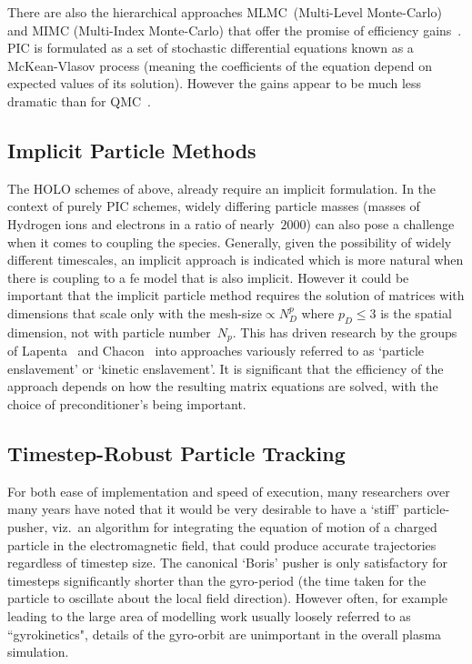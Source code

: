 There are also the hierarchical approaches MLMC~(Multi-Level Monte-Carlo) and MIMC (Multi-Index Monte-Carlo)
that offer the promise of efficiency gains~\cite{Ha18Mult}. PIC is formulated as a set of stochastic
differential equations known as a McKean-Vlasov process (meaning the coefficients of
the equation depend on expected values of its solution). However the gains appear to be much less
dramatic than for QMC~\cite{Ri15mult}.

\subsection{Implicit Particle Methods} \label{sec:implicit}
The HOLO schemes of  above, already require an implicit formulation.
In the context of purely PIC schemes, widely differing particle masses (masses of Hydrogen ions and electrons in a ratio
of nearly~$2000$) can also pose a challenge when it comes to coupling the species. 
Generally, given the possibility of widely
different timescales, an implicit approach is indicated which is more natural 
when there is coupling to a fe model that is also implicit.
However it could be important that the implicit particle method requires the solution of
matrices with dimensions that scale only with the mesh-size$\propto N^p_D$ where $p_D\leq 3$ is 
the spatial dimension, not with particle number~$N_p$. This has driven research by
the groups of Lapenta~\cite{Si18Comp} and Chacon~\cite{Ch11ener} into
approaches variously referred to as `particle enslavement' or `kinetic enslavement'.
It is significant that the efficiency of the approach depends on how the resulting matrix
equations are solved, with the choice of preconditioner's being important. 

\subsection{Timestep-Robust Particle Tracking} \label{sec:robupart}
For both ease of implementation and speed of execution, many researchers 
over many years have noted that it would be very desirable
to have a `stiff' particle-pusher, viz.\ an algorithm for integrating the equation of motion
of a charged particle in the electromagnetic field, that could produce accurate
trajectories regardless of timestep size. The canonical `Boris' pusher is only satisfactory
for timesteps significantly shorter than the gyro-period (the time taken for the particle to
oscillate about the local field direction). However often, for example leading to the large area 
of modelling work usually loosely referred to as
``gyrokinetics", details of the gyro-orbit are unimportant in the overall plasma simulation.

